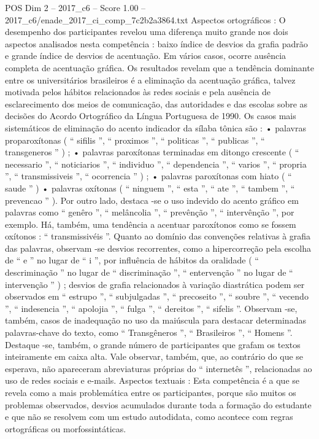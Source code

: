 \begin{textsample}{POS Dim 2 – 2017\_c6 – Score 1.00 – 2017\_c6/enade\_2017\_ci\_comp\_7c2b2a3864.txt}
Aspectos ortográficos : O desempenho dos participantes revelou uma diferença muito grande nos dois aspectos analisados nesta competência : baixo índice de desvios da grafia padrão e grande índice de desvios de acentuação.
Em vários casos, ocorre ausência completa de acentuação gráfica.
Os resultados revelam que a tendência dominante entre os universitários brasileiros é a eliminação da acentuação gráfica, talvez motivada pelos hábitos relacionados às redes sociais e pela ausência de esclarecimento dos meios de comunicação, das autoridades e das escolas sobre as decisões do Acordo Ortográfico da Língua Portuguesa de 1990.
Os casos mais sistemáticos de eliminação do acento indicador da sílaba tônica são : • palavras proparoxítonas ( “ sifilis ”, “ proximos ”, “ politicas ”, “ publicas ”, “ transgeneros ” ) ; • palavras paroxítonas terminadas em ditongo crescente ( “ necessario ”, “ noticiarios ”, “ individuo ”, “ dependencia ”, “ varios ”, “ propria ”, “ transmissiveis ”, “ ocorrencia ” ) ; • palavras paroxítonas com hiato ( “ saude ” ) • palavras oxítonas ( “ ninguem ”, “ esta ”, “ ate ”, “ tambem ”, “ prevencao ” ).
Por outro lado, destaca -se o uso indevido do acento gráfico em palavras como “ genêro ”, “ melâncolia ”, “ prevênção ”, “ intervênção ”, por exemplo.
Há, também, uma tendência a acentuar paroxítonos como se fossem oxítonos : “ transmissivéis ”.
Quanto ao domínio das convenções relativas à grafia das palavras, observam -se desvios recorrentes, como a hipercorreção pela escolha de “ e ” no lugar de “ i ”, por influência de hábitos da oralidade ( “ descriminação ” no lugar de “ discriminação ”, “ entervenção ” no lugar de “ intervenção ” ) ; desvios de grafia relacionados à variação diastrática podem ser observados em “ estrupo ”, “ subjulgadas ”, “ precoseito ”, “ soubre ”, “ vecendo ”, “ indesencia ”, “ apolojia ”, “ fulga ”, “ dereitos ”, “ sifelis ”.
Observam -se, também, casos de inadequação no uso da maiúscula para destacar determinadas palavras-chave do texto, como “ Transgêneros ”, “ Brasileiros ”, “ Homens ”.
Destaque -se, também, o grande número de participantes que grafam os textos inteiramente em caixa alta.
Vale observar, também, que, ao contrário do que se esperava, não apareceram abreviaturas próprias do “ internetês ”, relacionadas ao uso de redes sociais e e-mails.
Aspectos textuais : Esta competência é a que se revela como a mais problemática entre os participantes, porque são muitos os problemas observados, desvios acumulados durante toda a formação do estudante e que não se resolvem com um estudo autodidata, como acontece com regras ortográficas ou morfossintáticas.

\end{textsample}
